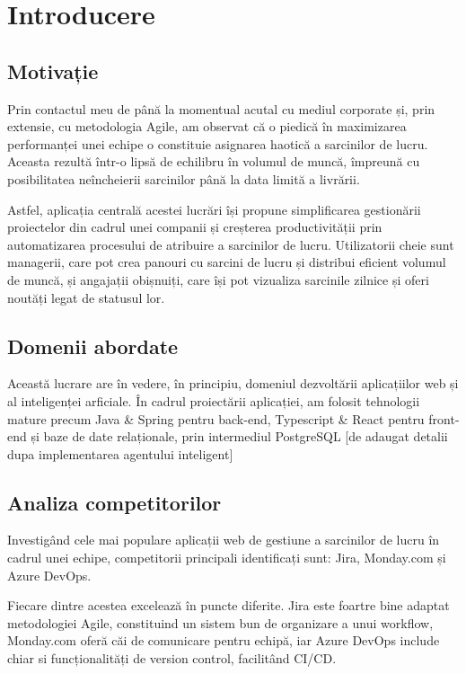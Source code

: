 \chapter{Introducere}

\section{Motivație}

Prin contactul meu de până la momentual acutal cu mediul corporate și, prin extensie, cu metodologia Agile, am observat că o piedică în maximizarea performanței unei echipe o constituie asignarea haotică a sarcinilor de lucru. Aceasta rezultă într-o lipsă de echilibru în volumul de muncă, împreună cu posibilitatea neîncheierii sarcinilor până la data limită a livrării.

Astfel, aplicația centrală acestei lucrări își propune simplificarea gestionării proiectelor din cadrul unei companii și creșterea productivității prin automatizarea procesului de atribuire a sarcinilor de lucru. Utilizatorii cheie sunt managerii, care pot crea panouri cu sarcini de lucru și distribui eficient volumul de muncă, și angajații obișnuiți, care își pot vizualiza sarcinile zilnice și oferi noutăți legat de statusul lor.

\section{Domenii abordate}

Această lucrare are în vedere, în principiu, domeniul dezvoltării aplicațiilor web și al inteligenței arficiale. În cadrul proiectării aplicației, am folosit tehnologii mature precum Java \& Spring pentru back-end, Typescript \& React pentru front-end și baze de date relaționale, prin intermediul PostgreSQL
 [de adaugat detalii dupa implementarea agentului inteligent]

\section{Analiza competitorilor}

Investigând cele mai populare aplicații web de gestiune a sarcinilor de lucru în cadrul unei echipe, competitorii principali identificați sunt: Jira, Monday.com și Azure DevOps.

Fiecare dintre acestea excelează în puncte diferite. Jira este foartre bine adaptat metodologiei Agile, constituind un sistem bun de organizare a unui workflow, Monday.com oferă căi de comunicare pentru echipă, iar Azure DevOps include chiar si funcționalități de version control, facilitând CI/CD. 

